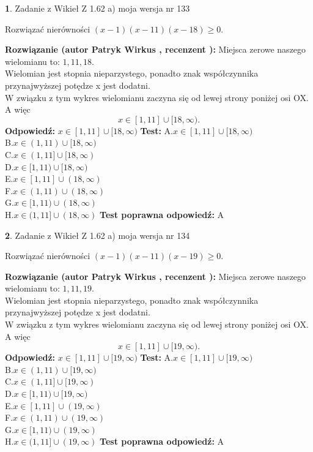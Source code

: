 \documentclass[12pt, a4paper]{article}
\theoremstyle{definition} %
\newtheorem{zad}{}
\newcommand{\zadStart}[1]{\begin{zad}#1\newline}
\newcommand{\zadStop}{\end{zad}}
\newcommand{\rozwStart}[2]{\noindent \textbf{Rozwiązanie (autor #1 , recenzent #2): }\newline}
\newcommand{\rozwStop}{\newline}
\newcommand{\odpStart}{\noindent \textbf{Odpowiedź:}\newline}
\newcommand{\odpStop}{\newline}
\newcommand{\testStart}{\noindent \textbf{Test:}\newline}
\newcommand{\testStop}{\newline}
\newcommand{\kluczStart}{\noindent \textbf{Test poprawna odpowiedź:}\newline}
\newcommand{\kluczStop}{\newline}
\begin{document}
\zadStart{Zadanie z Wikieł Z 1.62 a) moja wersja nr 133}

Rozwiązać nierówności $(x-1)(x-11)(x-18)\ge0$.
\zadStop
\rozwStart{Patryk Wirkus}{}
Miejsca zerowe naszego wielomianu to: $1, 11, 18$.\\
Wielomian jest stopnia nieparzystego, ponadto znak współczynnika przy\linebreak najwyższej potędze x jest dodatni.\\ W związku z tym wykres wielomianu zaczyna się od lewej strony poniżej osi OX. A więc $$x \in [1,11] \cup [18,\infty).$$
\rozwStop
\odpStart
$x \in [1,11] \cup [18,\infty)$
\odpStop
\testStart
A.$x \in [1,11] \cup [18,\infty)$\\
B.$x \in (1,11) \cup [18,\infty)$\\
C.$x \in (1,11] \cup [18,\infty)$\\
D.$x \in [1,11) \cup [18,\infty)$\\
E.$x \in [1,11] \cup (18,\infty)$\\
F.$x \in (1,11) \cup (18,\infty)$\\
G.$x \in [1,11) \cup (18,\infty)$\\
H.$x \in (1,11] \cup (18,\infty)$
\testStop
\kluczStart
A
\kluczStop



\zadStart{Zadanie z Wikieł Z 1.62 a) moja wersja nr 134}

Rozwiązać nierówności $(x-1)(x-11)(x-19)\ge0$.
\zadStop
\rozwStart{Patryk Wirkus}{}
Miejsca zerowe naszego wielomianu to: $1, 11, 19$.\\
Wielomian jest stopnia nieparzystego, ponadto znak współczynnika przy\linebreak najwyższej potędze x jest dodatni.\\ W związku z tym wykres wielomianu zaczyna się od lewej strony poniżej osi OX. A więc $$x \in [1,11] \cup [19,\infty).$$
\rozwStop
\odpStart
$x \in [1,11] \cup [19,\infty)$
\odpStop
\testStart
A.$x \in [1,11] \cup [19,\infty)$\\
B.$x \in (1,11) \cup [19,\infty)$\\
C.$x \in (1,11] \cup [19,\infty)$\\
D.$x \in [1,11) \cup [19,\infty)$\\
E.$x \in [1,11] \cup (19,\infty)$\\
F.$x \in (1,11) \cup (19,\infty)$\\
G.$x \in [1,11) \cup (19,\infty)$\\
H.$x \in (1,11] \cup (19,\infty)$
\testStop
\kluczStart
A
\kluczStop
\end{document}
